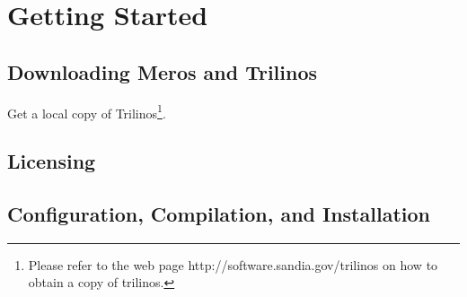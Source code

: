 \section{Getting Started}

\subsection{Downloading Meros and Trilinos}

Get a local copy of Trilinos\footnote{Please refer to the web page {\sc
  http://software.sandia.gov/trilinos} on how to obtain a copy of
    trilinos.}.

\subsection{Licensing}

\subsection{Configuration, Compilation, and Installation}

